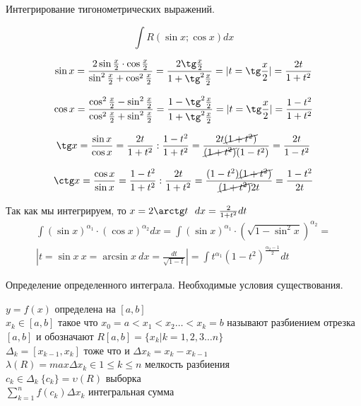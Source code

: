 \begin{title}
  Интегрирование тигонометрических выражений.
\end{title}

\[ \int R(\sin x; \cos x)dx \]

\[
  \sin x = \frac{2\sin \frac{x}{2} \cdot \cos \frac{x}{2}}{\sin^2 \frac{x}{2}
  + \cos^2 \frac{x}{2}} = \frac{2\tg \frac{x}{2}}{1 + \tg^2 \frac{x}{2}} =
  | t = \tg \frac{x}{2} | = \frac{2t}{1+t^2}
\]

\[
  \cos x = \frac{\cos^2 \frac{x}{2} - \sin^2 \frac{x}{2}}
  {\cos^2 \frac{x}{2} + \sin^2 \frac{x}{2}} =
  \frac{1 - \tg^2 \frac{x}{2}}{1 + \tg^2 \frac{x}{2}} =
  | t = \tg \frac{x}{2} | =
  \frac{1 - t^2}{1 + t^2}
\]

\[
  \tg x = \frac{\sin x}{\cos x} = \frac{2t}{1+t^2} : \frac{1-t^2}{1+t^2} =
  \frac{2t \cancel{(1+t^2)}}{\cancel{(1+t^2)} (1-t^2)} = \frac{2t}{1-t^2}
\]

\[
  \ctg x = \frac{\cos x}{\sin x} = \frac{1-t^2}{1+t^2} : \frac{2t}{1+t^2} =
  \frac{(1-t^2) \cancel{(1+t^2)}}{\cancel{(1+t^2)} 2t} = \frac{1-t^2}{2t}
\]

Так как мы интегрируем, то $x = 2\arctg t ~~ dx = \frac{2}{1+t^2}dt$
\begin{eqnarray*}
  \int (\sin x)^{\alpha_1} \cdot (\cos x)^{\alpha_2} dx =
  \int (\sin x)^{\alpha_1} \cdot (\sqrt{1 - \sin^2 x})^{\alpha_2} = \\
  | t = \sin x ~ x = \arcsin x ~ dx = \frac{dt}{\sqrt{1-t}} | =
  \int t^{\alpha_1}(1-t^2)^{\frac{\alpha_2 - 1}{2}} dt
\end{eqnarray*}




\begin{title}
  Определение определенного интеграла. Необходимые условия существования.
\end{title}

$y = f(x)$ определена на $[a,b]$\\
$x_k \in [a,b]$ такое что $x_0 = a < x_1 < x_2 \ldots < x_k = b$ называют
разбиением отрезка $[a,b]$ и обозначают $R[a,b] =
\{x_k | k = 1,2,3 \ldots n\}$\\
$\Delta_k = [x_{k-1}, x_k]$ тоже что и $\Delta{x_k} = x_k - x_{k-1}$\\
$\lambda(R) = max\Delta x_k \in 1 \le k \le n$ мелкость разбиения\\
$c_k \in \Delta_k ~ \{c_k\} = \upsilon(R)$ выборка\\
$\sum_{k=1}^{n} f(c_k)\Delta x_k$ интегральная сумма\\


